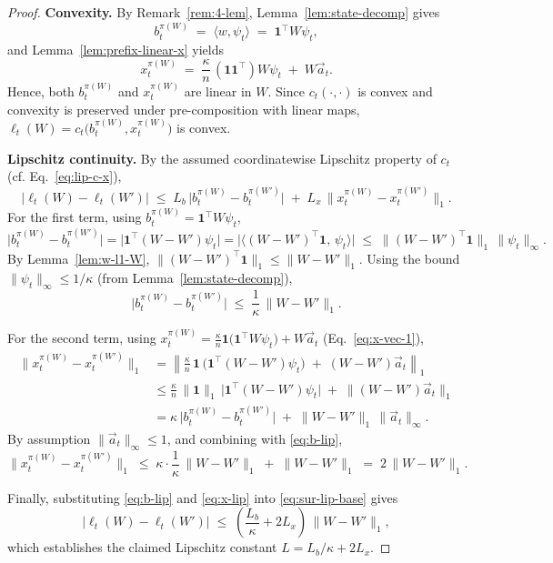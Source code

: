 \begin{proof}
\textbf{Convexity.}
By Remark~\ref{rem:4-lem}, Lemma~\ref{lem:state-decomp} gives
\[
b_t^{\pi(W)} \;=\; \langle w,\psi_t\rangle \;=\; \mathbf{1}^\top W \psi_t,
\]
and Lemma~\ref{lem:prefix-linear-x} yields
\[
x_t^{\pi(W)} 
\;=\;
\frac{\kappa}{n}\,(\mathbf{1}\mathbf{1}^\top)W\psi_t \;+\; W\vec{a}_t.
\]
Hence, both \(b_t^{\pi(W)}\) and \(x_t^{\pi(W)}\) are linear in \(W\). Since \(c_t(\cdot,\cdot)\) is convex and convexity is preserved under pre-composition with linear maps, \(\ell_t(W)=c_t\!\bigl(b_t^{\pi(W)},x_t^{\pi(W)}\bigr)\) is convex.

\medskip
\textbf{Lipschitz continuity.}
By the assumed coordinatewise Lipschitz property of \(c_t\) (cf. Eq.~\ref{eq:lip-c-x}),
\begin{equation}\label{eq:sur-lip-base}
\bigl|\ell_t(W)-\ell_t(W')\bigr|
\;\le\;
L_b\,\bigl|b_t^{\pi(W)}-b_t^{\pi(W')}\bigr|
\;+\;
L_x\,\bigl\|x_t^{\pi(W)}-x_t^{\pi(W')}\bigr\|_1.
\end{equation}
For the first term, using \(b_t^{\pi(W)}=\mathbf{1}^\top W\psi_t\),
\[
\bigl|b_t^{\pi(W)}-b_t^{\pi(W')}\bigr|
=
\bigl|\mathbf{1}^\top (W-W')\psi_t\bigr|
=
\bigl|\langle (W-W')^\top\mathbf{1},\,\psi_t\rangle\bigr|
\;\le\;
\|(W-W')^\top\mathbf{1}\|_1\,\|\psi_t\|_\infty.
\]
By Lemma~\ref{lem:w-l1-W}, \(\|(W-W')^\top\mathbf{1}\|_1\le \|W-W'\|_1\). Using the bound \(\|\psi_t\|_\infty\le 1/\kappa\) (from Lemma~\ref{lem:state-decomp}),
\begin{equation}\label{eq:b-lip}
\bigl|b_t^{\pi(W)}-b_t^{\pi(W')}\bigr|
\;\le\;
\frac{1}{\kappa}\,\|W-W'\|_1.
\end{equation}

For the second term, using \(x_t^{\pi(W)}=\frac{\kappa}{n}\mathbf{1}\bigl(\mathbf{1}^\top W\psi_t\bigr)+W\vec{a}_t\) (Eq.~\ref{eq:x-vec-1}),
\begin{align*}
\bigl\|x_t^{\pi(W)}-x_t^{\pi(W')}\bigr\|_1
&=
\left\|\frac{\kappa}{n}\,\mathbf{1}\,\bigl(\mathbf{1}^\top (W-W')\psi_t\bigr)
\;+\;
(W-W')\vec{a}_t\right\|_1 \\
&\le
\frac{\kappa}{n}\,\|\mathbf{1}\|_1\,\bigl|\mathbf{1}^\top (W-W')\psi_t\bigr|
\;+\;
\|(W-W')\vec{a}_t\|_1 \\
&=
\kappa\,\bigl|b_t^{\pi(W)}-b_t^{\pi(W')}\bigr|
\;+\;
\|W-W'\|_1\,\|\vec{a}_t\|_\infty.
\end{align*}
By assumption \(\|\vec{a}_t\|_\infty\le 1\), and combining with \eqref{eq:b-lip},
\begin{equation}\label{eq:x-lip}
\bigl\|x_t^{\pi(W)}-x_t^{\pi(W')}\bigr\|_1
\;\le\;
\kappa\cdot \frac{1}{\kappa}\,\|W-W'\|_1 \;+\; \|W-W'\|_1
\;=\;
2\,\|W-W'\|_1.
\end{equation}

Finally, substituting \eqref{eq:b-lip} and \eqref{eq:x-lip} into \eqref{eq:sur-lip-base} gives
\[
\bigl|\ell_t(W)-\ell_t(W')\bigr|
\;\le\;
\left(\frac{L_b}{\kappa}+2L_x\right)\,\|W-W'\|_1,
\]
which establishes the claimed Lipschitz constant \(L=L_b/\kappa+2L_x\).
\end{proof}









